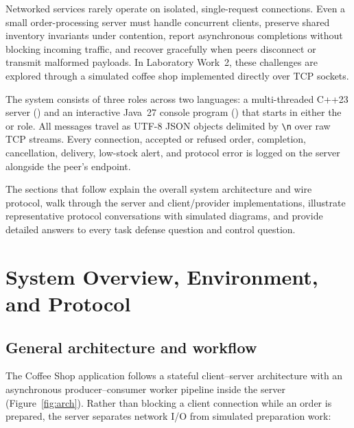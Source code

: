 \documentclass{../latex/utmreport}
\begin{document}
\utmintroduction
Networked services rarely operate on isolated, single-request connections. Even a small order-processing server must handle concurrent clients, preserve shared inventory invariants under contention, report asynchronous completions without blocking incoming traffic, and recover gracefully when peers disconnect or transmit malformed payloads. In Laboratory Work~2, these challenges are explored through a simulated coffee shop implemented directly over TCP sockets.

The system consists of three roles across two languages: a multi-threaded C++23 server () and an interactive Java~27 console program () that starts in either the  or  role. All messages travel as UTF-8 JSON objects delimited by \texttt{\textbackslash n} over raw TCP streams. Every connection, accepted or refused order, completion, cancellation, delivery, low-stock alert, and protocol error is logged on the server alongside the peer's  endpoint.

The sections that follow explain the overall system architecture and wire protocol, walk through the server and client/provider implementations, illustrate representative protocol conversations with simulated diagrams, and provide detailed answers to every task defense question and control question.

\chapter{System Overview, Environment, and Protocol}

\section{General architecture and workflow}
The Coffee Shop application follows a stateful client--server architecture with an asynchronous producer--consumer worker pipeline inside the server (Figure~\ref{fig:arch}). Rather than blocking a client connection while an order is prepared, the server separates network I/O from simulated preparation work:
\end{document}
